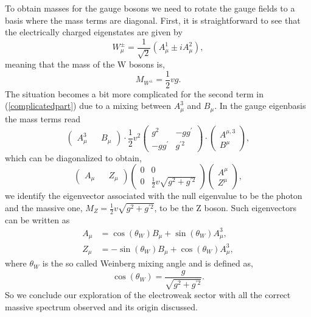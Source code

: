 \documentclass[10pt]{book}
\renewcommand{\(}{\left(}
\renewcommand{\)}{\right)}
\renewcommand{\[}{\left[}
\renewcommand{\]}{\right]}
\begin{document}
%
To obtain masses for the gauge bosons we need to rotate the gauge fields to a basis where the mass terms are diagonal. First, it is straightforward to see that the electrically charged eigenstates are given by %
\begin{equation}
W^\pm_\mu = \frac{1}{\sqrt{2}} (A^{1}_\mu \pm i A^{2}_\mu) , 
\label{gagestate}
\end{equation}
meaning that the mass of the W bosons is, 
\begin{equation}
M_{W^\pm}= \frac{1}{2} v g .
\end{equation}
%
The situation becomes a bit more complicated for the second term in (\ref{complicatedpart}) due to a mixing between $A_\mu^3$ and $B_\mu$. In the gauge eigenbasis the mass terms read
%
\begin{equation}
\begin{pmatrix}
A_\mu^3 && B_\mu
\end{pmatrix} \cdot  \frac{1}{2} v^2 \begin{pmatrix}
g^2  & -g g^\prime \\
-g g^\prime & g^{\prime 2} 
\end{pmatrix} \cdot \begin{pmatrix}
A^{\mu,3} \\  B^\mu
\end{pmatrix}  , 
\end{equation} 
%
which can be diagonalized to obtain,
%
\begin{equation}
\begin{pmatrix}
A_\mu && Z_\mu 
\end{pmatrix} \begin{pmatrix}
0  & 0 \\
0  & \frac{1}{2} v \sqrt{g^2 + g^{\prime 2}} 
\end{pmatrix}  \begin{pmatrix}
A^\mu \\ Z^\mu
\end{pmatrix} , 
\end{equation}
%
we identify the eigenvector associated with the null eigenvalue to be the photon and the massive one, $ M_Z =  \frac{1}{2} v \sqrt{g^2 + g^{\prime 2}} $, to be the Z boson. Such eigenvectors can be written as
%
\begin{align}
A_\mu &=\cos(\theta_W) B_\mu + \sin(\theta_W) A_\mu^3 ,  \\  
Z_\mu & =- \sin(\theta_W) B_\mu + \cos(\theta_W) A_\mu^3 , 
\end{align}
%
where $\theta_W$ is the so called Weinberg mixing angle and is defined as, 
%
\begin{equation}
\cos(\theta_W)=\frac{g}{ \sqrt{g^2 + g^{\prime 2}}} . 
\end{equation}
%
%
So we conclude our exploration of the electroweak sector with all the correct massive spectrum observed and its origin discussed.
\end{document}
